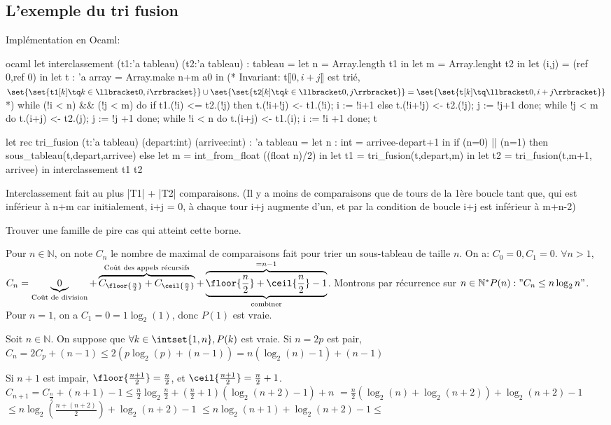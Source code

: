 \documentclass{scrartcl}
\begin{document}
		\subsection{L'exemple du tri fusion}
			Implémentation en Ocaml:
			\begin{code}{ocaml}
				let interclassement (t1:'a tableau) (t2:'a tableau) : tableau =
					let n = Array.length t1 in
					let m = Array.lenght t2 in
					let (i,j) = (ref 0,ref 0) in
					let t : 'a array = Array.make n+m a0 in
					(* Invariant: t$\llbracket 0,i+j \rrbracket$ est trié, $\set{\set{\mathtt{t1}[k] \tq k \in \llbracket 0,i \rrbracket}} \cup \set{\set{\mathtt{t2}[k] \tq k \in \llbracket 0,j \rrbracket }} = \set{\set{\mathtt{t}[k] \tq \llbracket 0, i+j \rrbracket}}$*)
					while (!i < n) && (!j < m) do
						if t1.(!i) <= t2.(!j) then
							t.(!i+!j) <- t1.(!i);
							i := !i+1
						else
							t.(!i+!j) <- t2.(!j);
							j := !j+1
					done; 
					while !j < m do
						t.(i+j) <- t2.(j);
						j := !j +1
					done;
					while !i < n do
						t.(i+j) <- t1.(i);
						i := !i +1
					done; t

				let rec tri_fusion (t:'a tableau) (depart:int) (arrivee:int) : 'a tableau =
					let n : int = arrivee-depart+1 in
					if (n=0) || (n=1) then sous_tableau(t,depart,arrivee)
					else 
						let m = int_from_float ((float n)/2) in
						let t1 = tri_fusion(t,depart,m) in
						let t2 = tri_fusion(t,m+1, arrivee) in
						interclassement t1 t2
			\end{code}

			Interclassement fait au plus |T1| + |T2| comparaisons. (Il y a moins de comparaisons que de tours de la 1ère boucle tant que, 
			qui est inférieur à n+m car initialement, i+j = 0, à chaque tour i+j augmente d'un, et par la condition de boucle i+j est inférieur à m+n-2)

			\exo Trouver une famille de pire cas qui atteint cette borne. 

			Pour $n \in \mathbb{N}$, on note $C_n$ le nombre de maximal de comparaisons
			fait pour trier un sous-tableau de taille $n$. On a:
			$C_0 = 0, C_1=0$.
			$\forall n > 1$, $C_n = \underbrace{0}_\text{Coût de division} + \overbrace{C_{\floor{\frac{n}{2}}} + C_{\ceil{\frac{n}{2}}}}^\text{Coût des appels récursifs} 
			+ \underbrace{\overbrace{\floor{\frac{n}{2}} + \ceil{\frac{n}{2}} - 1}^{=n-1}}_\text{combiner}$.
			Montrons par récurrence sur $n \in \mathbb{N}^* P(n): "C_n \leq n\log_2{n}"$. 
			Pour $n=1$, on a $C_1 = 0 = 1\log_2(1)$, donc $P(1)$ est vraie.
			
			Soit $n \in \mathbb{N}$. On suppose que $\forall k \in \intset{1,n}, P(k)$ est vraie. Si $n = 2p$ est pair, 
			$C_n = 2C_p + (n-1) \leq 2(p\log_2(p) + (n-1)) = n(\log_2(n)-1) + (n-1)$  

			Si $n+1$ est impair, $\floor{\frac{n+1}{2}} = \frac{n}{2}$, et $\ceil{\frac{n+1}{2}} = \frac{n}{2} + 1$.
			$C_{n+1} = C_\frac{n}{2} + (n+1) - 1 \leq \frac{n}{2}\log_2\frac{n}{2} + \left(\frac{n}{2}+1\right)\left(\log_2(n+2)-1\right) + n$
			$= \frac{n}{2}\left(\log_2(n) + \log_2(n+2)\right) + \log_2(n+2) - 1$
			$\leq n\log_2\left(\frac{n + (n+2)}{2}\right) + \log_2(n+2) - 1$ 
			$\leq n \log_2(n+1) + \log_2(n+2) - 1 \leq $ 
\end{document}
